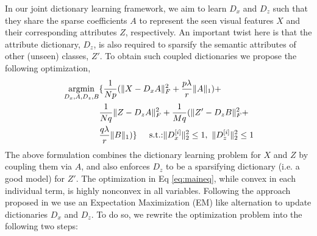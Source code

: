 \documentclass[letterpaper]{article} %
\begin{document}
 In our joint dictionary learning framework, we aim to learn $D_x$ and $D_z$ such that they share the sparse coefficients $A$ to represent the seen visual features $X$ and their corresponding attributes $Z$, respectively. An important twist here is that the attribute dictionary, $D_z$, is also required to sparsify the semantic attributes of other (unseen) classes, $Z'$. To obtain such coupled dictionaries we propose the following optimization,
\begin{eqnarray}
\begin{split}
 \underset{D_x,A,D_z,B}{\operatorname*{argmin}} & \{ \frac{1}{Np}(\|X-D_xA\|^2_F+ \frac{p\lambda}{r}\|A\|_1) + \\& \frac{1}{Nq}\|Z-D_zA\|^2_F+   
  \frac{1}{Mq}(\|Z'-D_zB\|^2_F+\\& \frac{q\lambda}{r}\|B\|_1) \} 
  \hspace{.2in} \text{s.t.:}  \|D^{[i]}_x\|^2_2\leq 1,~\|D^{[i]}_z\|^2_2\leq 1
\end{split}
\label{eq:maineq}
\end{eqnarray}
The above formulation combines the dictionary learning problem for $X$ and $Z$ by coupling them via $A$, and also enforces $D_z$ to be a sparsifying dictionary (i.e. a good model) for $Z'$. The optimization in Eq \eqref{eq:maineq}, while convex in each individual term, is highly nonconvex in all variables. Following the approach proposed in  \cite{yang2012coupled} we use an Expectation Maximization (EM) like alternation to update dictionaries $D_x$ and $D_z$. To do so, we rewrite the optimization problem into the following two steps:
\end{document}

